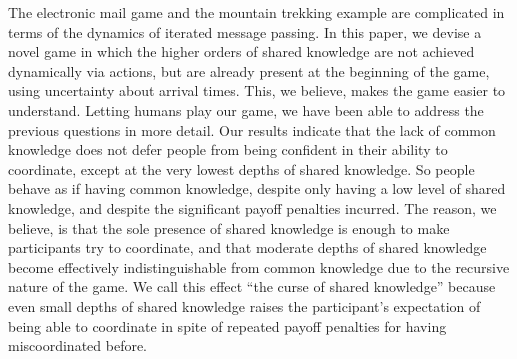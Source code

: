 \documentclass[twocolumn,a4paper,superscriptaddress,nofootinbib]{revtex4}
\newcommand{\tobo}[1]{{\color{red} TOBO: #1}}
\newcommand{\tsn}[1]{{\color{blue} TSN: #1}}
\newcommand{\re}[1]{{\color{brown} RE: #1}}
\begin{document}
The electronic mail game and the mountain trekking example are complicated in terms of the dynamics of iterated message passing. In this paper, we devise a novel game in which the higher orders of shared knowledge are not achieved dynamically via actions, but are already present at the beginning of the game, using uncertainty about arrival times. This, we believe, makes the game easier to understand. Letting humans play our game, we have been able to address the previous questions in more detail. Our results indicate that the lack of common knowledge does not defer people from being confident in their ability to coordinate, except at the very lowest depths of shared knowledge. So people behave as if having common knowledge, despite only having a low level of shared knowledge, and despite the significant payoff penalties incurred.
The reason, we believe, is that the sole presence of shared knowledge is enough to make participants try to coordinate, and that moderate depths of shared knowledge become effectively indistinguishable from common knowledge due to the recursive nature of the game. We call this effect ``the curse of shared knowledge'' because even small depths of shared knowledge raises the participant's expectation of being able to coordinate in spite of repeated payoff penalties for having miscoordinated before.
\end{document}
